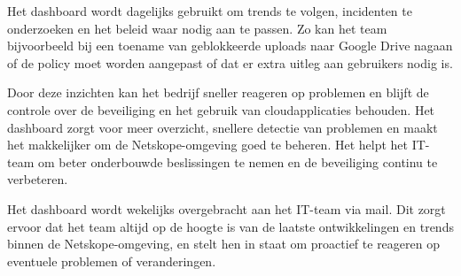 Het dashboard wordt dagelijks gebruikt om trends te volgen, incidenten te onderzoeken en het beleid waar nodig aan te passen. Zo kan het team bijvoorbeeld bij een toename van geblokkeerde uploads naar Google Drive nagaan of de policy moet worden aangepast of dat er extra uitleg aan gebruikers nodig is.

\vspace{2ex}

Door deze inzichten kan het bedrijf sneller reageren op problemen en blijft de controle over de beveiliging en het gebruik van cloudapplicaties behouden. Het dashboard zorgt voor meer overzicht, snellere detectie van problemen en maakt het makkelijker om de Netskope-omgeving goed te beheren. Het helpt het IT-team om beter onderbouwde beslissingen te nemen en de beveiliging continu te verbeteren.

\vspace{2ex}

Het dashboard wordt wekelijks overgebracht aan het IT-team via mail. Dit zorgt ervoor dat het team altijd op de hoogte is van de laatste ontwikkelingen en trends binnen de Netskope-omgeving, en stelt hen in staat om proactief te reageren op eventuele problemen of veranderingen.